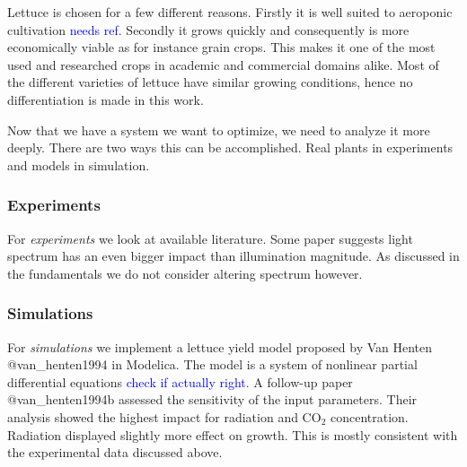 Lettuce is chosen for a few different reasons.
Firstly it is well suited to aeroponic cultivation \textcolor{Blue}{needs ref}.
Secondly it grows quickly and consequently is more economically viable as for instance grain crops.
This makes it one of the most used and researched crops in academic and commercial domains alike.
Most of the different varieties of lettuce have similar growing conditions, hence no differentiation is made in this work.

Now that we have a system we want to optimize, we need to analyze it more deeply.
There are two ways this can be accomplished.
Real plants in experiments and models in simulation.

\subsubsection{Experiments}
For \textit{experiments} we look at available literature.
Some paper suggests light spectrum has an even bigger impact than illumination magnitude.
As discussed in the fundamentals we do not consider altering spectrum however.

\subsubsection{Simulations}
For \textit{simulations} we implement a lettuce yield model proposed by Van Henten @van\_henten1994 in Modelica.
The model is a system of nonlinear partial differential equations \textcolor{Blue}{check if actually right}.
A follow-up paper @van\_henten1994b assessed the sensitivity of the input parameters.
Their analysis showed the highest impact for radiation and CO$_2$ concentration.
Radiation displayed slightly more effect on growth.
This is mostly consistent with the experimental data discussed above.



